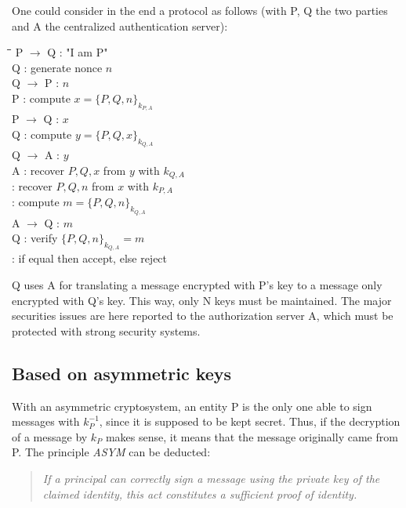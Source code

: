 One could consider in the end a protocol as follows (with P, Q the two parties and A the centralized authentication server):

\begin{tabbing}
	\hspace{4em}\=\hspace{4em}\=\hspace{2em}\=\kill
	\>  P $\rightarrow$ Q \>  : \> "I am P" \\
	\>  Q  \>  : \> generate nonce $n$ \\
	\>  Q $\rightarrow$ P \>  : \> $n$ \\
	\>  P  \>  : \> compute $x = \lbrace P, Q, n \rbrace_{k_{P,A}}$ 				\\
	\>  P $\rightarrow$ Q \>  : \> $x$ \\
	\>  Q  \>  : \> compute $y = \lbrace P, Q, x \rbrace_{k_{Q,A}}$ 				\\
	\>  Q $\rightarrow$ A \>  : \> $y$ \\
	\>  A  \>  : \> recover $P,Q,x$ from $y$ with $k_{Q,A}$ \\
	\>    \>  : \> recover $P,Q,n$ from $x$ with $k_{P,A}$ \\
	\>    \>  : \> compute $m = \lbrace P,Q,n \rbrace_{k_{Q,A}}$ \\
	\>  A $\rightarrow$ Q \>  : \> $m$ \\
	\>  Q \>  : \> verify $\lbrace P, Q, n \rbrace_{k_{Q,A}} = m$ \\
	\>    \>  : \> if equal then accept, else reject \\
\end{tabbing} 

Q uses A for translating a message encrypted with P's key to a message only encrypted with Q's key. This way, only N keys must be maintained. The major securities issues are here reported to the authorization server A, which must be protected with strong security systems.

\subsection{Based on asymmetric keys}
With an asymmetric cryptosystem, an entity P is the only one able to sign messages with $k_{P}^{-1}$, since it is supposed to be kept secret. Thus, if the decryption of a message by $k_{P}$ makes sense, it means that the message originally came from P. The principle \emph{ASYM} can be deducted\cite{Woo1997}:

\begin{quote}
	\textit{If a principal can correctly sign a message using the private key of the claimed identity, this act constitutes a sufficient proof of identity.}
\end{quote}

